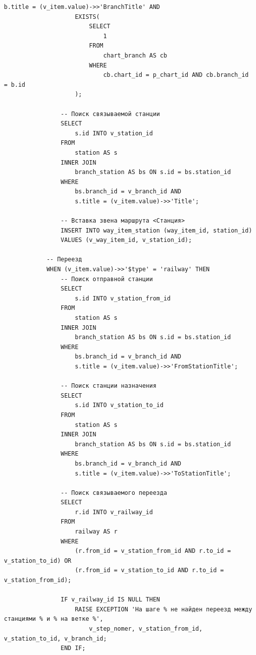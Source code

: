 \clearpage

\begin{lstlisting}[label=lst:add_route_json:2,caption=Реализация функции добавления маршрута (часть 2),firstnumber=62]
                    b.title = (v_item.value)->>'BranchTitle' AND
                    EXISTS(
                        SELECT
                            1
                        FROM
                            chart_branch AS cb
                        WHERE
                            cb.chart_id = p_chart_id AND cb.branch_id = b.id
                    );

                -- Поиск связываемой станции
                SELECT
                    s.id INTO v_station_id
                FROM
                    station AS s
                INNER JOIN
                    branch_station AS bs ON s.id = bs.station_id
                WHERE
                    bs.branch_id = v_branch_id AND
                    s.title = (v_item.value)->>'Title';

                -- Вставка звена маршрута <Станция>
                INSERT INTO way_item_station (way_item_id, station_id)
                VALUES (v_way_item_id, v_station_id);

            -- Переезд
            WHEN (v_item.value)->>'$type' = 'railway' THEN
                -- Поиск отправной станции
                SELECT
                    s.id INTO v_station_from_id
                FROM
                    station AS s
                INNER JOIN
                    branch_station AS bs ON s.id = bs.station_id
                WHERE
                    bs.branch_id = v_branch_id AND
                    s.title = (v_item.value)->>'FromStationTitle';
                
                -- Поиск станции назначения
                SELECT
                    s.id INTO v_station_to_id
                FROM
                    station AS s
                INNER JOIN
                    branch_station AS bs ON s.id = bs.station_id
                WHERE
                    bs.branch_id = v_branch_id AND
                    s.title = (v_item.value)->>'ToStationTitle';

                -- Поиск связываемого переезда
                SELECT
                    r.id INTO v_railway_id
                FROM
                    railway AS r
                WHERE
                    (r.from_id = v_station_from_id AND r.to_id = v_station_to_id) OR
                    (r.from_id = v_station_to_id AND r.to_id = v_station_from_id);

                IF v_railway_id IS NULL THEN
                    RAISE EXCEPTION 'На шаге % не найден переезд между станциями % и % на ветке %',
                        v_step_nomer, v_station_from_id, v_station_to_id, v_branch_id;
                END IF;
\end{lstlisting}

